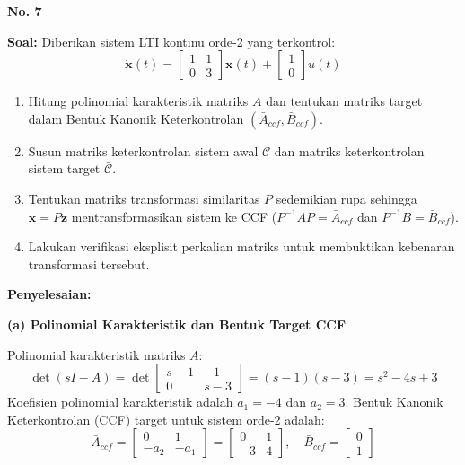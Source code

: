 \documentclass[11pt,a4paper]{article}
\begin{document}
\textbf{\large No. 7}

\textbf{Soal:}  
Diberikan sistem LTI kontinu orde-2 yang terkontrol:
$$\dot{\mathbf{x}}(t) = \begin{bmatrix} 1 & 1 \\ 0 & 3 \end{bmatrix} \mathbf{x}(t) + \begin{bmatrix} 1 \\ 0 \end{bmatrix} u(t)$$
\begin{enumerate}[label=(\alph*)]
    \item Hitung polinomial karakteristik matriks $A$ dan tentukan matriks target dalam Bentuk Kanonik Keterkontrolan $(\bar{A}_{ccf}, \bar{B}_{ccf})$.
    \item Susun matriks keterkontrolan sistem awal $\mathcal{C}$ dan matriks keterkontrolan sistem target $\bar{\mathcal{C}}$.
    \item Tentukan matriks transformasi similaritas $P$ sedemikian rupa sehingga $\mathbf{x} = P \mathbf{z}$ mentransformasikan sistem ke CCF ($P^{-1} A P = \bar{A}_{ccf}$ dan $P^{-1} B = \bar{B}_{ccf}$).
    \item Lakukan verifikasi eksplisit perkalian matriks untuk membuktikan kebenaran transformasi tersebut.
\end{enumerate}

\textbf{Penyelesaian:}

\textbf{(a) Polinomial Karakteristik dan Bentuk Target CCF}

Polinomial karakteristik matriks $A$:
$$\det(sI - A) = \det\begin{bmatrix} s - 1 & -1 \\ 0 & s - 3 \end{bmatrix} = (s - 1)(s - 3) = s^2 - 4s + 3$$
Koefisien polinomial karakteristik adalah $a_1 = -4$ dan $a_2 = 3$.
Bentuk Kanonik Keterkontrolan (CCF) target untuk sistem orde-2 adalah:
$$\bar{A}_{ccf} = \begin{bmatrix} 0 & 1 \\ -a_2 & -a_1 \end{bmatrix} = \begin{bmatrix} 0 & 1 \\ -3 & 4 \end{bmatrix}, \quad \bar{B}_{ccf} = \begin{bmatrix} 0 \\ 1 \end{bmatrix}$$
\end{document}
